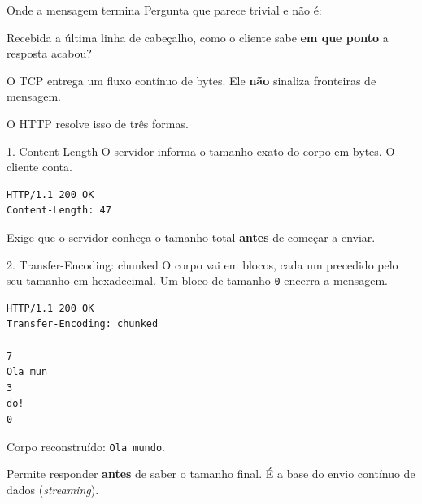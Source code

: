 \documentclass{beamer}
\begin{document}
\begin{frame}{Onde a mensagem termina}
  Pergunta que parece trivial e não é:

  \begin{block}{}
    Recebida a última linha de cabeçalho, como o cliente sabe \textbf{em que
    ponto} a resposta acabou?
  \end{block}

  \vspace{0.4cm}
  O TCP entrega um fluxo contínuo de bytes. Ele \textbf{não} sinaliza fronteiras
  de mensagem.

  \vspace{0.4cm}
  O HTTP resolve isso de três formas.
\end{frame}

\begin{frame}[fragile]{1. Content-Length}
  O servidor informa o tamanho exato do corpo em bytes. O cliente conta.

  \begin{verbatim}
HTTP/1.1 200 OK
Content-Length: 47

  \end{verbatim}

  \vspace{0.2cm}
  Exige que o servidor conheça o tamanho total \textbf{antes} de começar a
  enviar.
\end{frame}

\begin{frame}[fragile]{2. Transfer-Encoding: chunked}
  O corpo vai em blocos, cada um precedido pelo seu tamanho em hexadecimal.
  Um bloco de tamanho \texttt{0} encerra a mensagem.

  \begin{verbatim}
HTTP/1.1 200 OK
Transfer-Encoding: chunked

7
Ola mun
3
do!
0

  \end{verbatim}

  Corpo reconstruído: \texttt{Ola mundo}.

  \vspace{0.2cm}
  Permite responder \textbf{antes} de saber o tamanho final. É a base do envio
  contínuo de dados (\textit{streaming}).
\end{frame}
\end{document}
